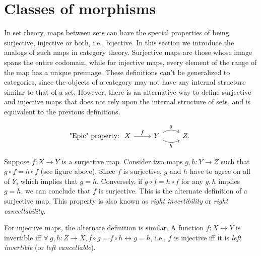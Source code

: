 \section{Classes of morphisms}

In set theory, maps between sets can have the special properties of
being surjective, injective or both, i.e., bijective. In this section
we introduce the analogs of such maps in category theory. Surjective
maps are those whose image spans the entire codomain, while for injective
maps, every element of the range of the map has a unique preimage.
These definitions can't be generalized to categories, since the objects
of a category may not have any internal structure similar to that
of a set. However, there is an alternative way to define surjective
and injective maps that does not rely upon the internal structure
of sets, and is equivalent to the previous definitions.

\[\text{"Epic" property:}\; 
\begin{tikzcd} 
X \arrow[r, "f"] & Y \arrow[r, bend left, "g"] \arrow[r, bend right, "h"'] & Z. 
\end{tikzcd}\]

Suppose $f:X\rightarrow Y$ is a surjective map. Consider two maps
$g,h:Y\rightarrow Z$ such that $g\circ f=h\circ f$ (see figure above).
Since $f$ is surjective, $g$ and $h$ have to agree on all of $Y$,
which implies that $g=h$. Conversely, if $g\circ f=h\circ f$ for
any $g,h$ implies $g=h$, we can conclude that $f$ is surjective.
This is the alternate definition of a surjective map. This property
is also known as \emph{right invertibility} or \emph{right cancellability}.

For injective maps, the alternate definition is similar. A function
$f:X\rightarrow Y$ is invertible iff $\forall~g,h:Z\rightarrow X,f\circ g=f\circ h\longleftrightarrow g=h$,
i.e., $f$ is injective iff it is \emph{left invertible} (or \emph{left
cancellable}).

